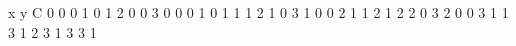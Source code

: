 x y C
0 0 0
1 0 1
2 0 0
3 0 0
0 1 0
1 1 1
2 1 0
3 1 0
0 2 1
1 2 1
2 2 0
3 2 0
0 3 1
1 3 1
2 3 1
3 3 1
